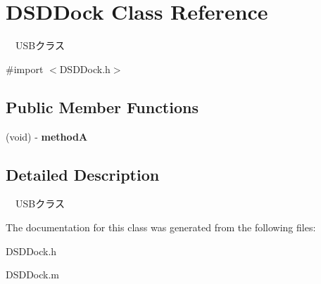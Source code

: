 \hypertarget{interface_d_s_d_dock}{\section{D\-S\-D\-Dock Class Reference}
\label{interface_d_s_d_dock}
}


　\-U\-S\-Bクラス  




{\ttfamily \#import $<$D\-S\-D\-Dock.\-h$>$}

\subsection*{Public Member Functions}
\begin{DoxyCompactItemize}
\item 
\hypertarget{interface_d_s_d_dock_acd6529d86dfe11ec3d48fee2e01ff421}{(void) -\/ {\bfseries method\-A}}\label{interface_d_s_d_dock_acd6529d86dfe11ec3d48fee2e01ff421}

\end{DoxyCompactItemize}


\subsection{Detailed Description}
　\-U\-S\-Bクラス 

The documentation for this class was generated from the following files\-:\begin{DoxyCompactItemize}
\item 
D\-S\-D\-Dock.\-h\item 
D\-S\-D\-Dock.\-m\end{DoxyCompactItemize}
